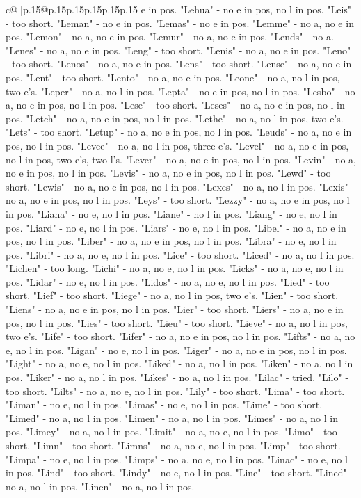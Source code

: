 \documentclass{article}
\begin{document}
{\begin{supertabular}{c@{$\;$}|p{.15\linewidth}@{}p{.15\linewidth}p{.15\linewidth}p{.15\linewidth}p{.15\linewidth}p{.15\linewidth}}
{{{e in pos. "Lehua" {-} no e in pos, no l in pos. "Leis" {-} too short. "Leman" {-} no e in pos. "Lemas" {-} no e in pos. "Lemme" {-} no a, no e in pos. "Lemon" {-} no a, no e in pos. "Lemur" {-} no a, no e in pos. "Lends" {-} no a. "Lenes" {-} no a, no e in pos. "Leng" {-} too short. "Lenis" {-} no a, no e in pos. "Leno" {-} too short. "Lenos" {-} no a, no e in pos. "Lens" {-} too short. "Lense" {-} no a, no e in pos. "Lent" {-} too short. "Lento" {-} no a, no e in pos. "Leone" {-} no a, no l in pos, two e's. "Leper" {-} no a, no l in pos. "Lepta" {-} no e in pos, no l in pos. "Lesbo" {-} no a, no e in pos, no l in pos. "Lese" {-} too short. "Leses" {-} no a, no e in pos, no l in pos. "Letch" {-} no a, no e in pos, no l in pos. "Lethe" {-} no a, no l in pos, two e's. "Lets" {-} too short. "Letup" {-} no a, no e in pos, no l in pos. "Leuds" {-} no a, no e in pos, no l in pos. "Levee" {-} no a, no l in pos, three e's. "Level" {-} no a, no e in pos, no l in pos, two e's, two l's. "Lever" {-} no a, no e in pos, no l in pos. "Levin" {-} no a, no e in pos, no l in pos. "Levis" {-} no a, no e in pos, no l in pos. "Lewd" {-} too short. "Lewis" {-} no a, no e in pos, no l in pos. "Lexes" {-} no a, no l in pos. "Lexis" {-} no a, no e in pos, no l in pos. "Leys" {-} too short. "Lezzy" {-} no a, no e in pos, no l in pos. "Liana" {-} no e, no l in pos. "Liane" {-} no l in pos. "Liang" {-} no e, no l in pos. "Liard" {-} no e, no l in pos. "Liars" {-} no e, no l in pos. "Libel" {-} no a, no e in pos, no l in pos. "Liber" {-} no a, no e in pos, no l in pos. "Libra" {-} no e, no l in pos. "Libri" {-} no a, no e, no l in pos. "Lice" {-} too short. "Liced" {-} no a, no l in pos. "Lichen" {-} too long. "Lichi" {-} no a, no e, no l in pos. "Licks" {-} no a, no e, no l in pos. "Lidar" {-} no e, no l in pos. "Lidos" {-} no a, no e, no l in pos. "Lied" {-} too short. "Lief" {-} too short. "Liege" {-} no a, no l in pos, two e's. "Lien" {-} too short. "Liens" {-} no a, no e in pos, no l in pos. "Lier" {-} too short. "Liers" {-} no a, no e in pos, no l in pos. "Lies" {-} too short. "Lieu" {-} too short. "Lieve" {-} no a, no l in pos, two e's. "Life" {-} too short. "Lifer" {-} no a, no e in pos, no l in pos. "Lifts" {-} no a, no e, no l in pos. "Ligan" {-} no e, no l in pos. "Liger" {-} no a, no e in pos, no l in pos. "Light" {-} no a, no e, no l in pos. "Liked" {-} no a, no l in pos. "Liken" {-} no a, no l in pos. "Liker" {-} no a, no l in pos. "Likes" {-} no a, no l in pos. "Lilac" {-} tried. "Lilo" {-} too short. "Lilts" {-} no a, no e, no l in pos. "Lily" {-} too short. "Lima" {-} too short. "Liman" {-} no e, no l in pos. "Limas" {-} no e, no l in pos. "Lime" {-} too short. "Limed" {-} no a, no l in pos. "Limen" {-} no a, no l in pos. "Limes" {-} no a, no l in pos. "Limey" {-} no a, no l in pos. "Limit" {-} no a, no e, no l in pos. "Limo" {-} too short. "Limn" {-} too short. "Limns" {-} no a, no e, no l in pos. "Limp" {-} too short. "Limpa" {-} no e, no l in pos. "Limps" {-} no a, no e, no l in pos. "Linac" {-} no e, no l in pos. "Lind" {-} too short. "Lindy" {-} no e, no l in pos. "Line" {-} too short. "Lined" {-} no a, no l in pos. "Linen" {-} no a, no l in pos. }}}
\end{supertabular}}
\end{document}

